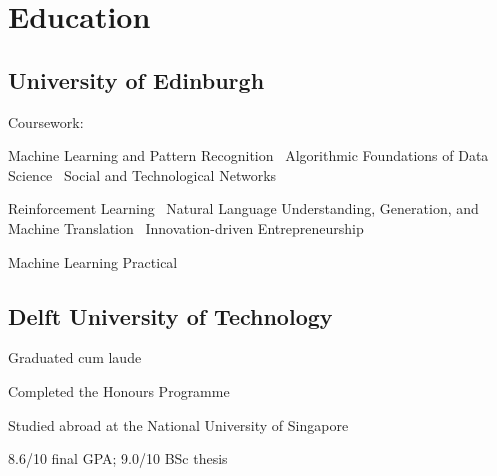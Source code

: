 \documentclass[]{deedy-resume-openfont}
\begin{document}

%
%

%
%
\begin{minipage}[t]{0.33\textwidth} 

\section{Education} 

\subsection{University of Edinburgh}

\vspace{0.2\topsep}
Coursework:
\begin{small}
\vspace{0.2\topsep}

Machine Learning and Pattern Recognition \textbullet \
Algorithmic Foundations of Data Science \textbullet \
Social and Technological Networks
\vspace{0.3\topsep}

Reinforcement Learning \textbullet \
Natural Language Understanding, Generation, and Machine Translation \textbullet \
Innovation-driven Entrepreneurship
\vspace{0.3\topsep}

\custombold{Full Year:}
Machine Learning Practical

\end{small}
\vspace{\topsep}

\subsection{Delft University of \newline Technology}
\vspace{\topsep}
\begin{tightemize}
    \item Graduated cum laude
    \item Completed the Honours Programme
    \item Studied abroad at the National University of Singapore
    \item 8.6/10 final GPA; 9.0/10 BSc thesis
\end{tightemize}


\end{minipage}
\end{document}

